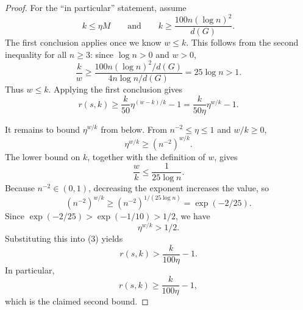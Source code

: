 \begin{proof}
For the ``in particular'' statement, assume
\[
  k\le \eta M
  \qquad\text{and}\qquad
  k\ge \frac{100n(\log n)^2}{d(G)}.
\]
The first conclusion applies once we know \(w\le k\). This follows from the second inequality for all \(n\ge3\): since \(\log n>0\) and \(w>0\),
\[
  \frac{k}{w}
  \ge
  \frac{100n(\log n)^2/d(G)}{4n\log n/d(G)}
  =25\log n>1.
\]
Thus \(w\le k\). Applying the first conclusion gives
\[
  r(s,k)\ge \frac{k}{50}\eta^{(w-k)/k}-1
  =\frac{k}{50\eta}\eta^{w/k}-1. \tag{3}
\]

It remains to bound \(\eta^{w/k}\) from below. From \(n^{-2}\le\eta\le1\) and \(w/k\ge0\),
\[
  \eta^{w/k}\ge (n^{-2})^{w/k}.
\]
The lower bound on \(k\), together with the definition of \(w\), gives
\[
  \frac{w}{k}\le \frac{1}{25\log n}.
\]
Because \(n^{-2}\in(0,1)\), decreasing the exponent increases the value, so
\[
  (n^{-2})^{w/k}\ge (n^{-2})^{1/(25\log n)}
  =\exp(-2/25).
\]
Since \(\exp(-2/25)>\exp(-1/10)>1/2\), we have
\[
  \eta^{w/k}>1/2.
\]
Substituting this into (3) yields
\[
  r(s,k)>\frac{k}{100\eta}-1.
\]
In particular,
\[
  r(s,k)\ge \frac{k}{100\eta}-1,
\]
which is the claimed second bound.
\end{proof}
